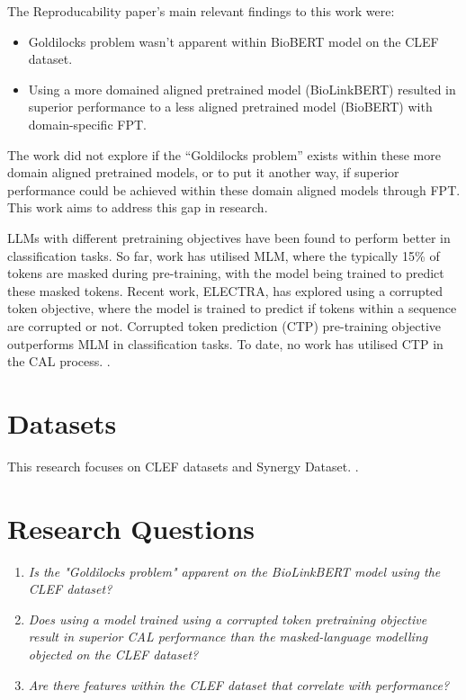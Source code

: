 \documentclass{article}
\begin{document}
The Reproducability paper's main relevant findings to this work were:
\begin{itemize}
    \item Goldilocks problem wasn't apparent within BioBERT model on the CLEF dataset. 
    \item Using a more domained aligned pretrained model (BioLinkBERT) resulted in superior performance to a less aligned pretrained model (BioBERT) with domain-specific FPT.
\end{itemize}

The work did not explore if the ``Goldilocks problem'' exists within these more domain aligned pretrained models, or to put it another way, if superior performance could be achieved within these domain aligned models through FPT. This work aims to address this gap in research. 

LLMs with different pretraining objectives have been found to perform better in classification tasks. So far, work has utilised MLM, where the typically 15\% of tokens are masked during pre-training, with the model being trained to predict these masked tokens. Recent work, ELECTRA, has explored using a corrupted token objective, where the model is trained to predict if tokens within a sequence are corrupted or not. Corrupted token prediction (CTP) pre-training objective outperforms MLM in classification tasks. To date, no work has utilised CTP in the CAL process. .

\section{Datasets}

This research focuses on CLEF datasets and Synergy Dataset. . 

\section{Research Questions}

\begin{enumerate}
    \item \textit{Is the "Goldilocks problem" apparent on the BioLinkBERT model using the CLEF dataset?}
    \item \textit{Does using a model trained using a corrupted token pretraining objective result in superior CAL performance than the masked-language modelling objected on the CLEF dataset?}
    \item \textit{Are there features within the CLEF dataset that correlate with performance?}
    
\end{enumerate}
\end{document}
